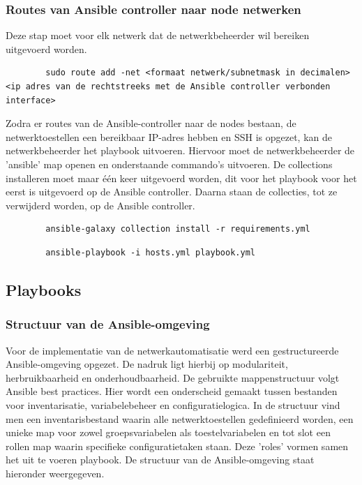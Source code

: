     \subsubsection{Routes van Ansible controller naar node netwerken}
    Deze stap moet voor elk netwerk dat de netwerkbeheerder wil bereiken uitgevoerd worden.
    \begin{listing}[H]
    \caption{Routes naar te beheren netwerken}
    \label{lst:route-networks}
    \begin{verbatim}   
        sudo route add -net <formaat netwerk/subnetmask in decimalen> <ip adres van de rechtstreeks met de Ansible controller verbonden interface>
    \end{verbatim}
    \end{listing}
Zodra er routes van de Ansible-controller naar de nodes bestaan, de netwerktoestellen een bereikbaar IP-adres hebben en SSH is opgezet, kan de netwerkbeheerder het playbook uitvoeren.
Hiervoor moet de netwerkbeheerder de 'ansible' map openen en onderstaande commando's uitvoeren. De collections installeren moet maar één keer uitgevoerd worden, dit voor het playbook voor het eerst is uitgevoerd op de Ansible controller. 
Daarna staan de collecties, tot ze verwijderd worden, op de Ansible controller.
    \begin{listing}[H]
    \caption{Collections installeren}
    \label{lst:install-collections}
    \begin{verbatim}   
        ansible-galaxy collection install -r requirements.yml
    \end{verbatim}
    \end{listing}
    \begin{listing}[H]
    \caption{Uitvoeren playbook}
    \label{lst:run-playbook}
    \begin{verbatim}   
        ansible-playbook -i hosts.yml playbook.yml 
    \end{verbatim}
    \end{listing}
\subsection{Playbooks}
\subsubsection{Structuur van de Ansible-omgeving}
Voor de implementatie van de netwerkautomatisatie werd een gestructureerde Ansible-omgeving opgezet. De nadruk ligt hierbij op modulariteit, herbruikbaarheid en onderhoudbaarheid.
De gebruikte mappenstructuur volgt Ansible best practices. Hier wordt een onderscheid gemaakt tussen bestanden voor inventarisatie, variabelebeheer en configuratielogica.
In de structuur vind men een inventarisbestand waarin alle netwerktoestellen gedefinieerd worden, een unieke map voor zowel groepsvariabelen als toestelvariabelen en tot slot een rollen map waarin specifieke configuratietaken staan.
Deze 'roles' vormen samen het uit te voeren playbook.
De structuur van de Ansible-omgeving staat hieronder weergegeven.

